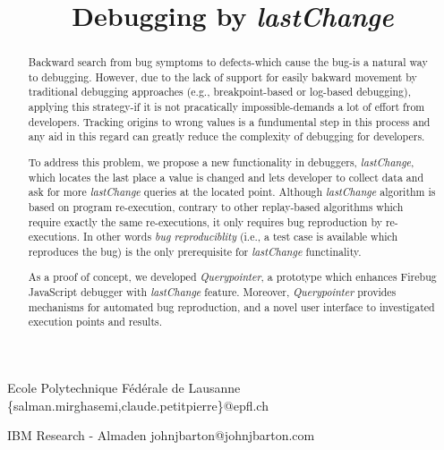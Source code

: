 \documentclass[preprint]{sigplanconf}
\begin{document}
\copyrightdata{[to be supplied]} 

\preprintfooter{}   %

\title{Debugging by \textit{lastChange}}
\subtitle{}

           {Ecole Polytechnique F\'ed\'erale de Lausanne}
           {\{salman.mirghasemi,claude.petitpierre\}@epfl.ch}

           {IBM Research - Almaden}
           {johnjbarton@johnjbarton.com}

\maketitle

\begin{abstract}
Backward search from bug symptoms to defects-which cause the bug-is a natural way to debugging. However, due to the lack of support for easily bakward movement by  traditional debugging approaches (e.g., breakpoint-based or log-based debugging), applying this strategy-if it is not pracatically impossible-demands a lot of effort from developers. Tracking origins to wrong values is a fundumental step in this process and any aid in this regard can greatly reduce the complexity of debugging for developers.

To address this problem, we propose a new functionality in debuggers, \textit{lastChange}, which locates the last place a value is changed and lets developer to collect data and ask for more \textit{lastChange} queries at the located point. Although \textit{lastChange} algorithm is based on program re-execution, contrary to other replay-based algorithms which require exactly the same re-executions, it only requires bug reproduction by re-executions. In other words \textit{bug reproduciblity} (i.e., a test case is available which reproduces the bug) is the only prerequisite for \textit{lastChange} functinality.

As a proof of concept, we developed \textit{Querypointer}, a prototype which enhances Firebug JavaScript debugger with \textit{lastChange} feature. Moreover, \textit{Querypointer} provides mechanisms for automated bug reproduction, and a novel user interface to investigated execution points and results.

\end{abstract}
\end{document}
